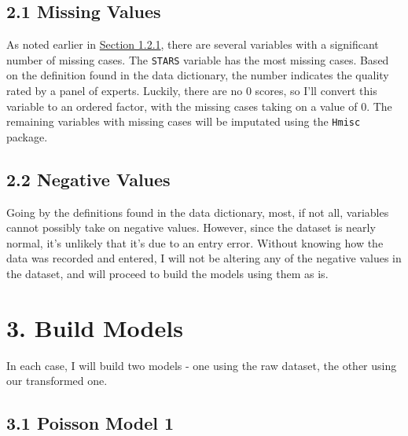 \documentclass[]{article}
\begin{document}
\hypertarget{missing-values}{%
\subsection{2.1 Missing Values}\label{missing-values}}

As noted earlier in \protect\hyperlink{missing-data}{Section 1.2.1},
there are several variables with a significant number of missing cases.
The \texttt{STARS} variable has the most missing cases. Based on the
definition found in the data dictionary, the number indicates the
quality rated by a panel of experts. Luckily, there are no 0 scores, so
I'll convert this variable to an ordered factor, with the missing cases
taking on a value of 0. The remaining variables with missing cases will
be imputated using the \texttt{Hmisc} package.

\hypertarget{negative-values}{%
\subsection{2.2 Negative Values}\label{negative-values}}

Going by the definitions found in the data dictionary, most, if not all,
variables cannot possibly take on negative values. However, since the
dataset is nearly normal, it's unlikely that it's due to an entry error.
Without knowing how the data was recorded and entered, I will not be
altering any of the negative values in the dataset, and will proceed to
build the models using them as is.

\hypertarget{build-models}{%
\section{3. Build Models}\label{build-models}}

In each case, I will build two models - one using the raw dataset, the
other using our transformed one.

\hypertarget{poisson-model-1}{%
\subsection{3.1 Poisson Model 1}\label{poisson-model-1}}
\end{document}
